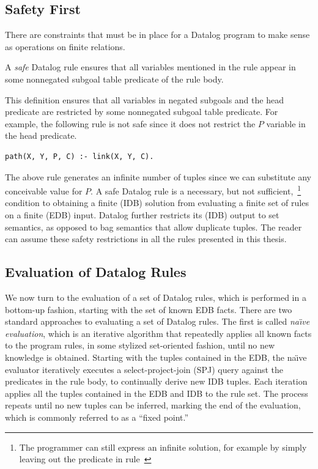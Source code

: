 \subsection{Safety First}
\label{ch:p2:sec:safety}

There are constraints that must be in place for a Datalog program to make sense
as operations on finite relations.  
\begin{mydef}
\ssp
A {\em safe} Datalog rule ensures that all variables mentioned in the rule
appear in some nonnegated subgoal table predicate of the rule body.
\end{mydef}
This definition ensures that all variables in negated subgoals and the head
predicate are restricted by some nonnegated subgoal table predicate.  For example,
the following rule is not safe since it does not restrict the $P$ variable in
the  head predicate.
\begin{lstlisting}[frame=none]
path(X, Y, P, C) :- link(X, Y, C).
\end{lstlisting}
The above rule generates an infinite number of  tuples since we can
substitute any conceivable value for $P$.  A safe Datalog rule is a necessary,
but not sufficient,~\footnote{The programmer can still express an infinite
solution, for example by simply leaving out the 
predicate in rule~} condition to obtaining a finite (IDB) solution from
evaluating a finite set of rules on a finite (EDB) input.  Datalog further
restricts its (IDB) output to set semantics, as opposed to bag semantics that
allow duplicate tuples.  The reader can assume these safety restrictions in all
the rules presented in this thesis.

\subsection{Evaluation of Datalog Rules}
\label{ch:p2:sec:eval}

We now turn to the evaluation of a set of Datalog rules, which is performed in
a bottom-up fashion, starting with the set of known EDB facts.  There are two
standard approaches to evaluating a set of Datalog rules.  The first is called
{\em na\"{\i}ve evaluation}, which is an iterative algorithm that repeatedly
applies all known facts to the program rules, in some stylized set-oriented
fashion, until no new knowledge is obtained.  Starting with the tuples
contained in the EDB, the na\"{\i}ve evaluator iteratively executes a
select-project-join (SPJ) query against the predicates in the rule body, to
continually derive new IDB tuples.  Each iteration applies all the tuples
contained in the EDB and IDB to the rule set.  The process repeats until no new
tuples can be inferred, marking the end of the evaluation, which is commonly
referred to as a ``fixed point.''

